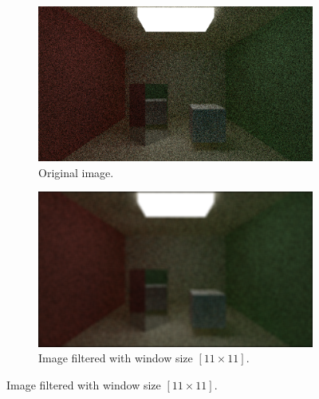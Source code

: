 \documentclass[titlepage,12pt]{report}
\begin{document}
\begin{figure}[H]
	\centering
	\begin{subfigure}{.48\textwidth}
		\centering
		\includegraphics[scale=0.2]{media/cornell_normal_10.png}
		\caption{Original image.}
		\label{mean_filter_1}
	\end{subfigure}
	\begin{subfigure}{.48\textwidth}
		\centering
		\includegraphics[scale=0.2]{media/mean/cornell_normal_10_mean_filter_11.png}
		\caption{Image filtered with window size $[11 \times 11]$.}
		\label{mean_filter_2}
	\end{subfigure}


\end{figure}
\end{document}
